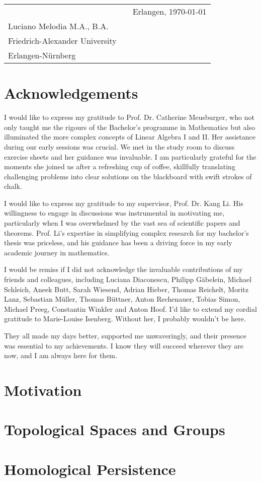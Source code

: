 \documentclass[b5paper, 11pt, twoside]{report}
\begin{document}
\vspace{2cm}
\begin{tabular}{@{}p{3.5in}p{2in}p{2in}@{}}
	\hrulefill                 &   & Erlangen, \today \\
	Luciano Melodia M.A., B.A. &   &                  \\
	Friedrich-Alexander University \\
	Erlangen-Nürnberg
\end{tabular}

\chapter*{Acknowledgements}
I would like to express my gratitude to Prof. Dr. Catherine Meusburger, who not only taught me the rigours of the Bachelor's programme in Mathematics but also illuminated the more complex concepts of Linear Algebra I and II. Her assistance during our early sessions was crucial. We met in the study room to discuss exercise sheets and her guidance was invaluable. I am particularly grateful for the moments she joined us after a refreshing cup of coffee, skillfully translating challenging problems into clear solutions on the blackboard with swift strokes of chalk.

I would like to express my gratitude to my supervisor, Prof. Dr. Kang Li. His willingness to engage in discussions was instrumental in motivating me, particularly when I was overwhelmed by the vast sea of scientific papers and theorems. Prof. Li's expertise in simplifying complex research for my bachelor's thesis was priceless, and his guidance has been a driving force in my early academic journey in mathematics.

I would be remiss if I did not acknowledge the invaluable contributions of my friends and colleagues, including Luciana Diaconescu, Philipp Gäbelein, Michael Schleich, Aneek Butt, Sarah Wiesend, Adrian Hieber, Thomas Reichelt, Moritz Lanz, Sebastian Müller, Thomas Büttner, Anton Rechenauer, Tobias Simon, Michael Preeg, Constantin Winkler and Anton Hoof. I'd like to extend my cordial gratitude to Marie-Louise Isenberg. Without her, I probably wouldn't be here.

They all made my days better, supported me unwaveringly, and their presence was essential to my achievements. I know they will succeed wherever they are now, and I am always here for them.

\newpage
\tableofcontents

\singlespacing
\chapter{Motivation}


\chapter{Topological Spaces and Groups}


\chapter{Homological Persistence}


\singlespacing
\printbibliography

\newpage
\printindex
\end{document}
